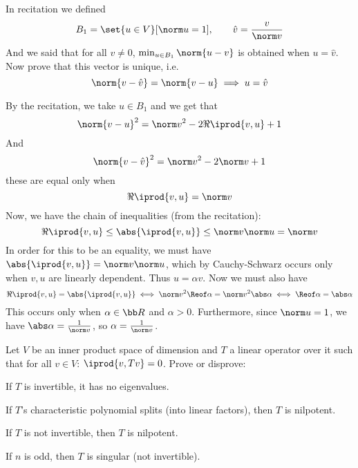 \bexerc

    In recitation we defined
    $$ B_1 = \set{u\in V}[\norm u=1],\qquad \hat v =\frac v{\norm v} $$
    And we said that for all $v\neq0$, $\min_{u\in B_1}\norm{u-v}$ is obtained when $u=\hat v$.
    Now prove that this vector is unique, i.e.
    $$ \norm{v-\hat v} = \norm{v-u} \implies u = \hat v $$

\eexerc

By the recitation, we take $u\in B_1$ and we get that
$$ \norm{v-u}^2 = \norm v^2 - 2\Re\iprod{v,u} + 1 $$
And
$$ \norm{v-\hat v}^2 = \norm v^2-2\norm v + 1 $$
these are equal only when
$$ \Re\iprod{v,u} = \norm v $$
Now, we have the chain of inequalities (from the recitation):
$$ \Re\iprod{v,u} \leq \abs{\iprod{v,u}} \leq \norm v\norm u = \norm v $$
In order for this to be an equality, we must have $\abs{\iprod{v,u}}=\norm v\norm u$, which by Cauchy-Schwarz occurs only when $v,u$ are linearly dependent.
Thus $u=\alpha v$.
Now we must also have
$$ \Re\iprod{v,u} = \abs{\iprod{v,u}} \iff \norm v^2\Reof\alpha = \norm v^2\abs\alpha \iff \Reof\alpha = \abs\alpha $$
This occurs only when $\alpha\in{\bb R}$ and $\alpha>0$.
Furthermore, since $\norm u=1$, we have $\abs\alpha=\frac1{\norm v}$, so $\alpha=\frac1{\norm v}$.
\qqed

\bexerc

    Let $V$ be an inner product space of dimension and $T$ a linear operator over it such that for all $v\in V$: $\iprod{v,Tv}=0$.
    Prove or disprove:
    \benum
        \item If $T$ is invertible, it has no eigenvalues.
        \item If $T$'s characteristic polynomial splits (into linear factors), then $T$ is nilpotent.
        \item If $T$ is not invertible, then $T$ is nilpotent.
        \item If $n$ is odd, then $T$ is singular (not invertible).
    \eenum

\eexerc

